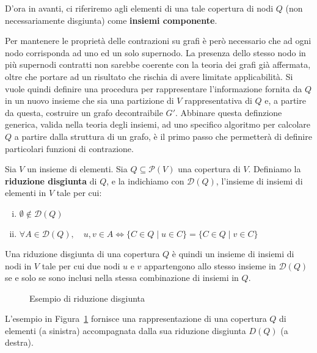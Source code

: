 D'ora in avanti, ci riferiremo agli elementi di una tale copertura di nodi $Q$ (non necessariamente disgiunta)
come \textbf{insiemi componente}. \newline

Per mantenere le proprietà delle contrazioni su grafi è però necessario che ad ogni nodo corrisponda ad uno ed un solo
supernodo.
La presenza dello stesso nodo in più supernodi contratti non sarebbe coerente con la teoria dei grafi
già affermata, oltre che portare ad un risultato che rischia di avere limitate applicabilità.
Si vuole quindi definire una procedura per rappresentare l'informazione fornita da $Q$ in un nuovo insieme che sia una
partizione di $V$ rappresentativa di $Q$ e, a partire da questa, costruire un grafo decontraibile $G'$.
Abbinare questa definzione generica, valida nella teoria degli insiemi, ad uno specifico algoritmo per calcolare
$Q$ a partire dalla struttura di un grafo, è il primo passo che permetterà di definire particolari funzioni di
contrazione.


\begin{definition}
Sia $V$ un insieme di elementi. Sia $Q \subseteq \mathcal{P}(V)$ una copertura di $V$.
Definiamo la \textbf{riduzione disgiunta} di $Q$, e la indichiamo con $\mathcal{D}(Q)$,
l'insieme di insiemi di elementi in $V$ tale per cui:
\begin{enumerate}[(i)]
    \item $\emptyset \notin \mathcal{D}(Q)$
    \item $\forall A \in \mathcal{D}(Q), \quad u, v \in A \Leftrightarrow \{C \in Q \mid u \in C\} = \{C \in Q \mid v \in C\}$
\end{enumerate}
\end{definition}

Una riduzione disgiunta di una copertura $Q$ è quindi un insieme di insiemi di nodi in $V$ tale per cui due
nodi $u$ e $v$ appartengono allo stesso insieme in $\mathcal{D}(Q)$ se e solo se sono inclusi nella stessa combinazione
di insiemi in $Q$. \newline

\begin{figure}[!h] \centering

\caption{Esempio di riduzione disgiunta}
\label{fig:disjoint_reduction_example}
\end{figure}

L'esempio in Figura~\ref{fig:disjoint_reduction_example} fornisce una rappresentazione di una copertura $Q$ di
elementi (a sinistra) accompagnata dalla sua riduzione disgiunta $D(Q)$ (a destra).

